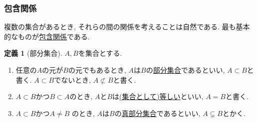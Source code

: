 \documentclass[dvipdfmx,cjk,10.2pt]{beamer}
\theoremstyle{definition}
\newtheorem{Ex}[Thm]{例}
\newtheorem{Def}[Thm]{定義}
\begin{document}
%
%
%





\begin{frame}
\frametitle{包含関係}   


複数の集合があるとき, それらの間の関係を考えることは自然である.  
最も基本的なものが\underline{包含関係}である.

\begin{Def}[部分集合]
$A, B$を集合とする.
\begin{enumerate}
\item 任意の$A$の元が$B$の元でもあるとき, $A$は$B$の\underline{部分集合}であるといい, $A \subset B$と書く.  
$A \subset B$でないとき, $A \not\subset B$と書く.
\item $A \subset B$かつ$B \subset A$のとき, $A$と$B$は\underline{(集合として)等しい}といい, $A=B$と書く. 
\item $A \subset B$かつ$A \ne B$ のとき, $A$は$B$の\underline{真部分集合}であるといい, $A \subsetneq B$とかく.
\end{enumerate} 
\end{Def}


\end{frame}


\end{document}
